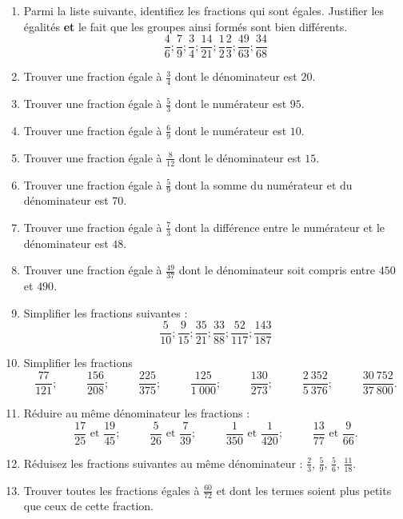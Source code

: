 \documentclass[14pt]{extreport}
\theoremstyle{plain}
\begin{document}
\begin{enumerate}
\item Parmi la liste suivante, identifiez les fractions qui sont égales. Justifier les égalités \textbf{et} le fait que les groupes ainsi formés sont bien différents.
\[ \frac46;  \frac79; \frac34;  \frac{14}{21}; \frac12 \frac23; \frac{49}{63}; \frac{34}{68}\]
\item Trouver une fraction égale à $\frac34$ dont le dénominateur est $20$. 
\item Trouver une fraction égale à $\frac53$ dont le numérateur est $95$.
\item Trouver une fraction égale à $\frac69$ dont le numérateur est $10$.
\item Trouver une fraction égale à $\frac8{12}$ dont le dénominateur est $15$.
\item Trouver une fraction égale à $\frac59$ dont la somme du numérateur et du dénominateur est $70$. 
\item Trouver une fraction égale à $\frac73$ dont la différence entre le numérateur et le dénominateur est $48$. 
\item Trouver une fraction égale à $\frac{49}{37}$ dont le dénominateur soit compris entre $450$ et $490$.
\item Simplifier les fractions suivantes : 
\[ \frac5{10}; \frac9{15} ; \frac{35}{21} ; \frac{33}{88} ; \frac{52}{117} ; \frac{143}{187}\]

\item Simplifier les fractions 
\[ \frac{77}{121}; \phantom{meow}
\frac{156}{208};\phantom{meow}
\frac{225}{375};\phantom{meow}
\frac{125}{1~000};\phantom{meow}
\frac{130}{273}; \phantom{meow}
\frac{2~352}{5~376}; \phantom{meow}
\frac{30~752}{37~800}.\]
\item Réduire au même dénominateur les fractions : 
\[ \frac{17}{25}\text{  et  }\frac{19}{45};\phantom{meow}
\frac{5}{26}\text{  et  }\frac{7}{39};\phantom{meow}
\frac1{350}\text{  et  }\frac1{420};\phantom{meow}
\frac{13}{77}\text{  et  }\frac{9}{66}.\]
\item 
Réduisez les fractions suivantes au même dénominateur : $\frac23$, $\frac59$, $\frac56$, $\frac{11}{18}$. 

\item Trouver toutes les fractions égales à $\frac{60}{72}$ et dont les termes soient plus petits que ceux
de cette fraction. 


\end{enumerate}
\end{document}
